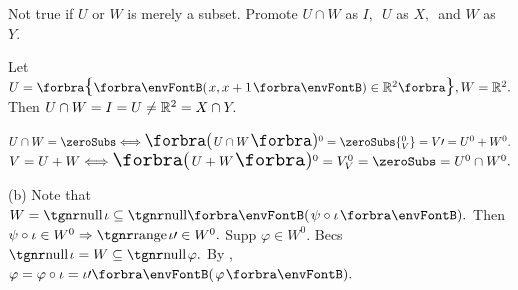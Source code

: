 \AComm Not true if $U$ or $W$ is merely a subset. Promote $U\cap W$ as $I,$ \,$U$ as $X,$ \,and $W$ as $Y.$\par
\AExa Let $U=\Bra{\Par{x,x+1}\in\Rbb^2},W=\Rbb^2.$ Then $U\cap W=I=U\neq{\mathbb{R}}^2=X\cap Y.$
\SepLine
\pagebreak

$U\cap W=\zeroSubs\Longleftrightarrow \BigPar{U\cap W}{^0}=\zeroSubs{_V^0}=V\apostrophe=U^0+W^0.$\parSol{\vspace{1pt}}
$V=U+W\Longleftrightarrow\BigPar{U+W}{^0}=V_V^0=\zeroSubs=U^0\cap W^0.$\PfEnd
\SepLine

(b) \Or Note that $W=\null{\iota}\subseteq\Null\Par{\psi\circ\iota}.$ Then $\psi\circ\iota\in W^0\Rightarrow\range\iota\apostrophe\in W^0.$\parSol{\Hb}
\Blind{\Or}Supp $\varphi\in W^0.$ Becs $\null\iota=W\subseteq\null\varphi.$ By , $\varphi=\varphi\circ\iota=\iota\apostrophe\Par{\varphi}.$\PfEnd
\SepLine

